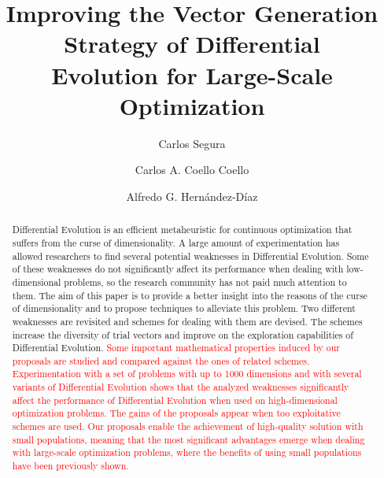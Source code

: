 \documentclass[preprint,3p]{elsarticle}
\begin{document}
\begin{frontmatter}

\title{Improving the Vector Generation Strategy of Differential \\ Evolution for Large-Scale Optimization}

\author[label1]{Carlos Segura}

\author[label2]{Carlos A. Coello Coello}

\author[label3]{Alfredo G. Hern\'andez-D\'iaz}

\address[label1]{Area of Computer Science, Centre for Research in Mathematics (CIMAT), Callej\'on Jalisco s/n, Mineral de Valenciana, Guanajuato, Guanajuato 36240, Mexico}
\address[label2]{Evolutionary Computation Group, Department of Computer Science, Center of Research and Advanced Studies, National Polytechnic Institute, Mexico City 07300, Mexico}
\address[label3]{Department of Economics, Quantitative Methods and Economic History, Pablo de Olavide University, Seville, Spain}

\begin{abstract}
Differential Evolution is an efficient metaheuristic for continuous optimization that suffers from the curse of dimensionality.
A large amount of experimentation has allowed researchers to find
several potential weaknesses in Differential Evolution.
Some of these weaknesses do not significantly affect its performance when dealing with low-dimensional problems,
so the research community has not paid much attention to them.
The aim of this paper is to provide a better insight into the reasons of the curse of dimensionality
and to propose techniques to alleviate this problem.
Two different weaknesses are revisited and schemes for dealing with them are devised.
The schemes increase the diversity of trial vectors and improve on the exploration capabilities of Differential Evolution.
\textcolor{red}{
Some important mathematical properties induced by our proposals are studied and compared against the ones of related schemes.
Experimentation with a set of problems with up to 1000 dimensions and with several variants of Differential Evolution
shows that the analyzed weaknesses
significantly affect the performance of Differential Evolution when used on high-dimensional optimization problems.
The gains of the proposals appear when too exploitative schemes are used.
Our proposals enable the achievement of high-quality solution with small populations,
meaning that the most significant advantages emerge when dealing with large-scale optimization problems,
where the benefits of using small populations have been previously shown.
}
\end{abstract}


\end{frontmatter}
\end{document}
